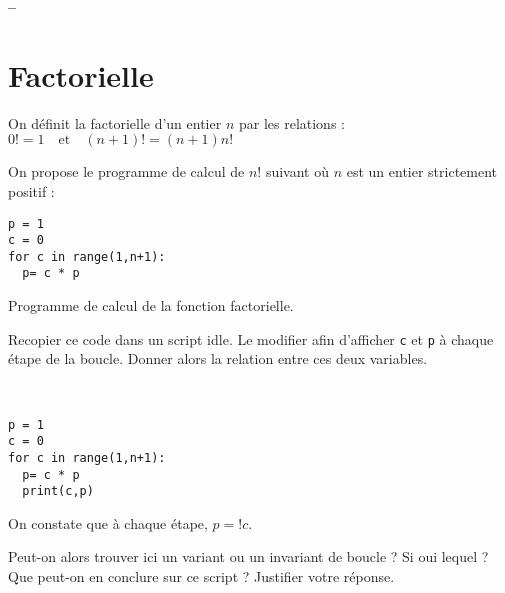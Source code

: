 

%




\begin{center}
{\Large\bf {\type} \no {\numero} -- \descrip}
\end{center}


\section{Factorielle}

On définit la factorielle d'un entier $n$ par les relations : $0!=1 \quad \text{et}\quad (n+1)!=(n+1)n!$

On propose le programme de calcul de $n!$ suivant où $n$ est un entier strictement positif :

\begin{listing}[!h]
\begin{verbatim}
p = 1
c = 0
for c in range(1,n+1):
  p= c * p
\end{verbatim}
\caption{Programme de calcul de la fonction factorielle.}
\label{prog:factorielle}
\end{listing}

\begin{exercice}
Recopier ce code dans un script idle. Le modifier afin d'afficher \verb?c? et \verb?p? à chaque étape de la boucle. Donner alors la relation entre ces deux variables.
\end{exercice}

\begin{solution}~\ 
\begin{verbatim}
p = 1
c = 0
for c in range(1,n+1):
  p= c * p
  print(c,p)
\end{verbatim}
On constate que à chaque étape, $p=!c$.
\end{solution}

\begin{exercice}
Peut-on alors trouver ici un variant ou un invariant de boucle ? Si oui lequel ? Que peut-on en conclure sur ce script ? Justifier votre réponse.
\end{exercice}

